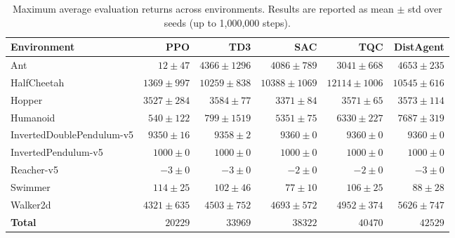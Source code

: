 \begin{table}[ht]
\centering
\caption{Maximum average evaluation returns across environments. Results are reported as mean $\pm$ std over seeds (up to 1,000,000 steps).}
\label{tab:results}
\begin{tabular}{lrrrrr}
\toprule
\textbf{Environment} & \textbf{PPO} & \textbf{TD3} & \textbf{SAC} & \textbf{TQC} & \textbf{DistAgent} \\
\midrule
Ant & $12 \pm 47$ & $4366 \pm 1296$ & $4086 \pm 789$ & $3041 \pm 668$ & $4653 \pm 235$ \\
HalfCheetah & $1369 \pm 997$ & $10259 \pm 838$ & $10388 \pm 1069$ & $12114 \pm 1006$ & $10545 \pm 616$ \\
Hopper & $3527 \pm 284$ & $3584 \pm 77$ & $3371 \pm 84$ & $3571 \pm 65$ & $3573 \pm 114$ \\
Humanoid & $540 \pm 122$ & $799 \pm 1519$ & $5351 \pm 75$ & $6330 \pm 227$ & $7687 \pm 319$ \\
InvertedDoublePendulum-v5 & $9350 \pm 16$ & $9358 \pm 2$ & $9360 \pm 0$ & $9360 \pm 0$ & $9360 \pm 0$ \\
InvertedPendulum-v5 & $1000 \pm 0$ & $1000 \pm 0$ & $1000 \pm 0$ & $1000 \pm 0$ & $1000 \pm 0$ \\
Reacher-v5 & $-3 \pm 0$ & $-3 \pm 0$ & $-2 \pm 0$ & $-2 \pm 0$ & $-3 \pm 0$ \\
Swimmer & $114 \pm 25$ & $102 \pm 46$ & $77 \pm 10$ & $106 \pm 25$ & $88 \pm 28$ \\
Walker2d & $4321 \pm 635$ & $4503 \pm 752$ & $4693 \pm 572$ & $4952 \pm 374$ & $5626 \pm 747$ \\
\midrule
\textbf{Total} & $20229$ & $33969$ & $38322$ & $40470$ & $42529$ \\
\bottomrule
\end{tabular}
\end{table}